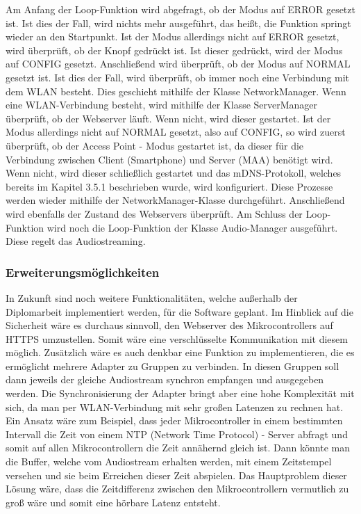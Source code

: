 \documentclass[11pt, twoside]{article}
\begin{document}
\noindent Am Anfang der Loop-Funktion wird abgefragt, ob der Modus auf \glqq ERROR\grqq{} gesetzt ist. Ist dies der Fall, wird nichts mehr ausgeführt, das heißt, die Funktion springt wieder an den Startpunkt. Ist der Modus allerdings nicht auf \glqq ERROR\grqq{} gesetzt, wird überprüft, ob der Knopf gedrückt ist. Ist dieser gedrückt, wird der Modus auf \glqq CONFIG\grqq{} gesetzt. Anschließend wird überprüft, ob der Modus auf \glqq NORMAL\grqq{} gesetzt ist. Ist dies der Fall, wird überprüft, ob immer noch eine Verbindung mit dem WLAN besteht. Dies geschieht mithilfe der Klasse \glqq NetworkManager\grqq{}. Wenn eine WLAN-Verbindung besteht, wird mithilfe der Klasse \glqq ServerManager\grqq{} überprüft, ob der Webserver läuft. Wenn nicht, wird dieser gestartet. Ist der Modus allerdings nicht auf \glqq NORMAL\grqq{} gesetzt, also auf \glqq CONFIG\grqq{}, so wird zuerst überprüft, ob der Access Point - Modus gestartet ist, da dieser für die Verbindung zwischen Client (Smartphone) und Server (MAA) benötigt wird. Wenn nicht, wird dieser schließlich gestartet und das mDNS-Protokoll, welches bereits im Kapitel 3.5.1 beschrieben wurde, wird konfiguriert. Diese Prozesse werden wieder mithilfe der \glqq NetworkManager\grqq{}-Klasse durchgeführt. Anschließend wird ebenfalls der Zustand des Webservers überprüft. Am Schluss der Loop-Funktion wird noch die Loop-Funktion der Klasse Audio-Manager ausgeführt. Diese regelt das Audiostreaming.
\subsubsection{Erweiterungsmöglichkeiten}
In Zukunft sind noch weitere Funktionalitäten, welche außerhalb der Diplomarbeit implementiert werden, für die Software geplant. Im Hinblick auf die Sicherheit wäre es durchaus sinnvoll, den Webserver des Mikrocontrollers auf HTTPS umzustellen. Somit wäre eine verschlüsselte Kommunikation mit diesem möglich. Zusätzlich wäre es auch denkbar eine Funktion zu implementieren, die es ermöglicht mehrere Adapter zu Gruppen zu verbinden. In diesen Gruppen soll dann jeweils der gleiche Audiostream synchron empfangen und ausgegeben werden. Die Synchronisierung der Adapter bringt aber eine hohe Komplexität mit sich, da man per WLAN-Verbindung mit sehr großen Latenzen zu rechnen hat. Ein Ansatz wäre zum Beispiel, dass jeder Mikrocontroller in einem bestimmten Intervall die Zeit von einem NTP (Network Time Protocol) - Server abfragt und somit auf allen Mikrocontrollern die Zeit annähernd gleich ist. Dann könnte man die Buffer, welche vom Audiostream erhalten werden, mit einem Zeitstempel versehen und sie beim Erreichen dieser Zeit abspielen. Das Hauptproblem dieser Lösung wäre, dass die Zeitdifferenz zwischen den Mikrocontrollern vermutlich zu groß wäre und somit eine hörbare Latenz entsteht.
\end{document}
